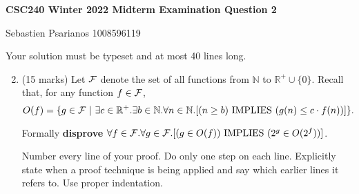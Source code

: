 \documentclass[11pt]{article}
\newcommand{\Implies}{\mbox{ IMPLIES }}
\def\nats{{\mathbb N}}
\def\reals{{\mathbb R}}
\newcounter{ind}
\begin{document}
\begin{center}
{\bf \Large \bf CSC240 Winter 2022 Midterm Examination Question 2}\\
\begin{solution}
Sebastien Psarianos 1008596119
\end{solution}
\end{center}

\begin{question}
Your solution must be typeset and at most 40 lines long.
\end{question}


\begin{enumerate}
\setcounter{enumi}{1}
\item
\begin{question}
(15 marks)
Let ${\cal F}$ denote the set of all functions from $\nats$ to $\reals^+\cup \{0\}$.
Recall that, for any function $f \in {\cal F}$,
$$O(f) = \{ g \in {\cal F} \ | \ \exists c \in \reals^+.\exists b \in \nats. \forall n \in \nats. [(n \geq b) \Implies (g(n) \leq c \cdot f(n))] \}.$$

Formally {\bf disprove} $\forall f \in  {\cal F}. \forall g \in {\cal F}.[(g \in O(f)) \Implies (2^g \in O(2^f))]$.

Number every line of your proof. Do only one step on each line.
Explicitly state when a proof technique is being applied and say which earlier lines it refers to.
Use proper indentation.
\end{question}


\end{enumerate}
\end{document}
